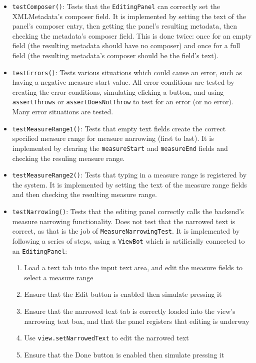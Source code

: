 \documentclass[11pt]{article}
\begin{document}
\begin{itemize}
\item \texttt{testComposer()}: Tests that the \texttt{EditingPanel} can correctly set the XMLMetadata's composer field.  It is implemented by setting the text of the panel's composer entry, then getting the panel's resulting metadata, then checking the metadata's composer field.  This is done twice: once for an empty field (the resulting metadata should have no composer) and once for a full field (the resulting metadata's composer should be the field's text).
\item \texttt{testErrors()}: Tests various situations which could cause an error, such as having a negative measure start value.  All error conditions are tested by creating the error conditions, simulating clicking a button, and using \texttt{assertThrows} or \texttt{assertDoesNotThrow} to test for an error (or no error).  Many error situations are tested.
\item \texttt{testMeasureRange1()}: Tests that empty text fields create the correct specified measure range for measure narrowing (first to last).  It is implemented by clearing the \texttt{measureStart} and \texttt{measureEnd} fields and checking the resuling measure range.
\item \texttt{testMeasureRange2()}: Tests that typing in a measure range is registered by the system.  It is implemented by setting the text of the measure range fields and then checking the resulting measure range.
\item \texttt{testNarrowing()}: Tests that the editing panel correctly calls the backend's measure narrowing functionality.  Does not test that the narrowed text is correct, as that is the job of \texttt{MeasureNarrowingTest}.  It is implemented by following a series of steps, using a \texttt{ViewBot} which is artificially connected to an \texttt{EditingPanel}:
\begin{enumerate}
\item Load a text tab into the input text area, and edit the measure fields to select a measure range
\item Ensure that the Edit button is enabled then simulate pressing it
\item Ensure that the narrowed text tab is correctly loaded into the view's narrowing text box, and that the panel registers that editing is underway
\item Use \texttt{view.setNarrowedText} to edit the narrowed text
\item Ensure that the Done button is enabled then simulate pressing it

\end{enumerate}
\end{itemize}
\end{document}
